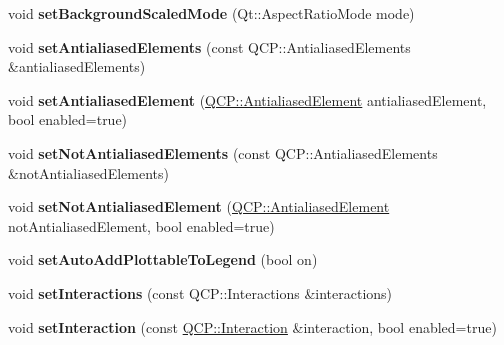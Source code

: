 \begin{DoxyCompactItemize}
\item 
void {\bfseries set\+Background\+Scaled\+Mode} (Qt\+::\+Aspect\+Ratio\+Mode mode)\hypertarget{class_q_custom_plot_a4c0eb4865b7949f62e1cb97db04a3de0}{}\label{class_q_custom_plot_a4c0eb4865b7949f62e1cb97db04a3de0}

\item 
void {\bfseries set\+Antialiased\+Elements} (const Q\+C\+P\+::\+Antialiased\+Elements \&antialiased\+Elements)\hypertarget{class_q_custom_plot_af6f91e5eab1be85f67c556e98c3745e8}{}\label{class_q_custom_plot_af6f91e5eab1be85f67c556e98c3745e8}

\item 
void {\bfseries set\+Antialiased\+Element} (\hyperlink{namespace_q_c_p_ae55dbe315d41fe80f29ba88100843a0c}{Q\+C\+P\+::\+Antialiased\+Element} antialiased\+Element, bool enabled=true)\hypertarget{class_q_custom_plot_aeef813bcf7efab8e765f9f87ec454691}{}\label{class_q_custom_plot_aeef813bcf7efab8e765f9f87ec454691}

\item 
void {\bfseries set\+Not\+Antialiased\+Elements} (const Q\+C\+P\+::\+Antialiased\+Elements \&not\+Antialiased\+Elements)\hypertarget{class_q_custom_plot_ae10d685b5eabea2999fb8775ca173c24}{}\label{class_q_custom_plot_ae10d685b5eabea2999fb8775ca173c24}

\item 
void {\bfseries set\+Not\+Antialiased\+Element} (\hyperlink{namespace_q_c_p_ae55dbe315d41fe80f29ba88100843a0c}{Q\+C\+P\+::\+Antialiased\+Element} not\+Antialiased\+Element, bool enabled=true)\hypertarget{class_q_custom_plot_afc657938a707c890e449ae89203a076d}{}\label{class_q_custom_plot_afc657938a707c890e449ae89203a076d}

\item 
void {\bfseries set\+Auto\+Add\+Plottable\+To\+Legend} (bool on)\hypertarget{class_q_custom_plot_ad8858410c2db47b7104040a3aa61c3fc}{}\label{class_q_custom_plot_ad8858410c2db47b7104040a3aa61c3fc}

\item 
void {\bfseries set\+Interactions} (const Q\+C\+P\+::\+Interactions \&interactions)\hypertarget{class_q_custom_plot_a5ee1e2f6ae27419deca53e75907c27e5}{}\label{class_q_custom_plot_a5ee1e2f6ae27419deca53e75907c27e5}

\item 
void {\bfseries set\+Interaction} (const \hyperlink{namespace_q_c_p_a2ad6bb6281c7c2d593d4277b44c2b037}{Q\+C\+P\+::\+Interaction} \&interaction, bool enabled=true)\hypertarget{class_q_custom_plot_a422bf1bc6d56dac75a3d805d9a65902c}{}\label{class_q_custom_plot_a422bf1bc6d56dac75a3d805d9a65902c}


\end{DoxyCompactItemize}
